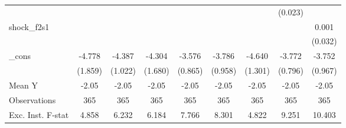 {\begin{tabular}{l*{8}{c}}
            &                     &                     &                     &                     &                     &                     &     (0.023)         &                     \\
\addlinespace
shock\_f2s1  &                     &                     &                     &                     &                     &                     &                     &       0.001         \\
            &                     &                     &                     &                     &                     &                     &                     &     (0.032)         \\
\addlinespace
\_cons      &      -4.778\sym{**} &      -4.387\sym{***}&      -4.304\sym{**} &      -3.576\sym{***}&      -3.786\sym{***}&      -4.640\sym{***}&      -3.772\sym{***}&      -3.752\sym{***}\\
            &     (1.859)         &     (1.022)         &     (1.680)         &     (0.865)         &     (0.958)         &     (1.301)         &     (0.796)         &     (0.967)         \\
\midrule
Mean Y      &       -2.05         &       -2.05         &       -2.05         &       -2.05         &       -2.05         &       -2.05         &       -2.05         &       -2.05         \\
Observations&         365         &         365         &         365         &         365         &         365         &         365         &         365         &         365         \\
Exc. Inst. F-stat&       4.858         &       6.232         &       6.184         &       7.766         &       8.301         &       4.822         &       9.251         &      10.403         \\
\bottomrule
\end{tabular}
}
